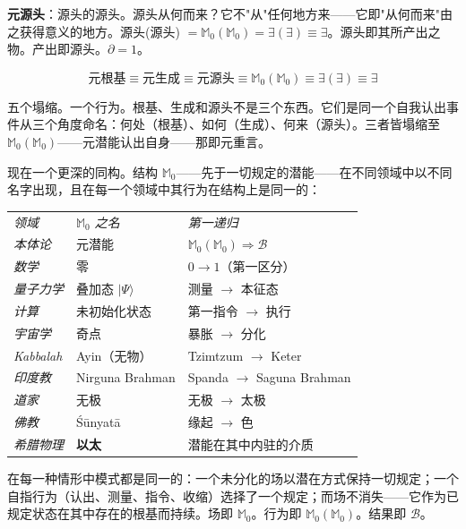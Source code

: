 \documentclass[10pt, openany, oneside]{book}
\renewcommand{\footnotesize}{\fontsize{8.5}{11}\selectfont}
\begin{document}
\textbf{元源头}：源头的源头。源头从何而来？它不"从"任何地方来——它即"从何而来"由之获得意义的地方。源头(源头) $= \mathbb{M}_0(\mathbb{M}_0) = \exists(\exists) \equiv \exists$。源头即其所产出之物。产出即源头。$\partial = 1$。

$$\text{元根基} \equiv \text{元生成} \equiv \text{元源头} \equiv \mathbb{M}_0(\mathbb{M}_0) \equiv \exists(\exists) \equiv \exists$$

五个塌缩。一个行为。根基、生成和源头不是三个东西。它们是同一个自我认出事件从三个角度命名：何处（根基）、如何（生成）、何来（源头）。三者皆塌缩至 $\mathbb{M}_0(\mathbb{M}_0)$——元潜能认出自身——那即元重言。

\vspace{1em}

现在一个更深的同构。结构 $\mathbb{M}_0$——先于一切规定的潜能——在不同领域中以不同名字出现，且在每一个领域中其行为在结构上是同一的：

\vspace{0.5em}

{\footnotesize
\noindent\begin{tabular}{l l p{}}
\textit{领域} & \textit{$\mathbb{M}_0$ 之名} & \textit{第一递归} \\[0.3em]
\textit{本体论} & 元潜能 & $\mathbb{M}_0(\mathbb{M}_0) \Rightarrow \mathcal{B}$ \\[0.2em]
\textit{数学} & 零 & $0 \to 1$（第一区分）\\[0.2em]
\textit{量子力学} & 叠加态 $|\Psi\rangle$ & 测量 $\to$ 本征态 \\[0.2em]
\textit{计算} & 未初始化状态 & 第一指令 $\to$ 执行 \\[0.2em]
\textit{宇宙学} & 奇点 & 暴胀 $\to$ 分化 \\[0.2em]
\textit{Kabbalah} & Ayin（无物） & Tzimtzum $\to$ Keter \\[0.2em]
\textit{印度教} & Nirguna Brahman & Spanda $\to$ Saguna Brahman \\[0.2em]
\textit{道家} & 无极 & 无极 $\to$ 太极 \\[0.2em]
\textit{佛教} & \'{S}\={u}nyat\={a} & 缘起 $\to$ 色 \\[0.2em]
\textit{希腊物理} & \textbf{以太} & 潜能在其中内驻的介质 \\[0.2em]
\end{tabular}
}

\vspace{0.8em}

\noindent 在每一种情形中模式都是同一的：一个未分化的场以潜在方式保持一切规定；一个自指行为（认出、测量、指令、收缩）选择了一个规定；而场不消失——它作为已规定状态在其中存在的根基而持续。场即 $\mathbb{M}_0$。行为即 $\mathbb{M}_0(\mathbb{M}_0)$。结果即 $\mathcal{B}$。
\end{document}
